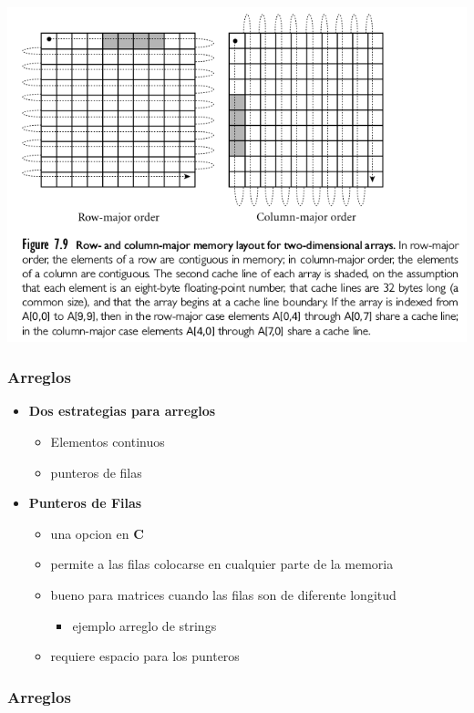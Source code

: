 \documentclass[11pt]{article}
\begin{document}
\includegraphics[width=.9\linewidth]{rowcolumnmajor.png}

\subsubsection*{Arreglos}
\label{sec:orgheadline21}

\begin{itemize}
\item \textbf{Dos estrategias para arreglos}
\begin{itemize}
\item Elementos continuos
\item punteros de filas
\end{itemize}
\item \textbf{Punteros de Filas}
\begin{itemize}
\item una opcion en \textbf{C}
\item permite a las filas colocarse en cualquier parte de la memoria
\item bueno para matrices cuando las filas son de diferente longitud
\begin{itemize}
\item ejemplo arreglo de strings
\end{itemize}
\item requiere espacio para los punteros
\end{itemize}
\end{itemize}

\subsubsection*{Arreglos}
\label{sec:orgheadline22}
\end{document}
